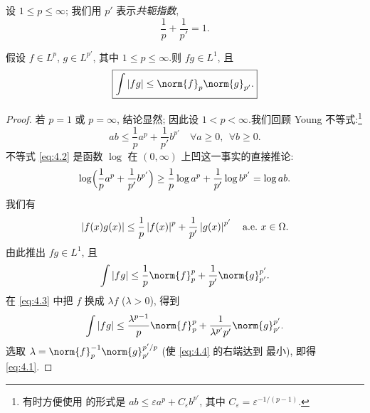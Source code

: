 \begin{notation}
设 $1\le p\le\infty$; 我们用 $p'$ 表示\emph{共轭指数},
\begin{equation*}
\boxed{\frac1p+\frac1{p'}=1.}
\end{equation*}
\end{notation}

\begin{keytheorem}
\label{thm:4.6}
假设 $f\in L^p$, $g\in L^{p'}$, 其中 $1\le p\le\infty$.则 $fg\in L^1$, 且
\begin{equation}
\boxed{\int\abs{fg}\le\norm{f}_p\norm{g}_{p'}.}
\label{eq:4.1}
\end{equation}
\end{keytheorem}

\begin{proof}
若 $p=1$ 或 $p=\infty$, 结论显然; 因此设 $1<p<\infty$.我们回顾 Young 不等式:\footnote{有时方便使用
的形式是 $ab\le\varepsilon a^p+C_\varepsilon b^{p'}$, 其中
$C_\varepsilon=\varepsilon^{-1/(p-1)}$.}
\begin{equation}
\boxed{ab\le\frac1pa^p+\frac1{p'}b^{p'}\quad\forall a\ge0,\ \ \forall b\ge0.}
\label{eq:4.2}
\end{equation}
不等式 \eqref{eq:4.2} 是函数 $\log$ 在 $(0,\infty)$ 上凹这一事实的直接推论:
\begin{equation*}
\log\Bigl(\frac1pa^p+\frac1{p'}b^{p'}\Bigr)\ge\frac1p\log a^p+\frac1{p'}\log b^{p'}
=\log ab.
\end{equation*}
我们有
\begin{equation*}
\left|f(x)g(x)\right|\le\frac1p\left|f(x)\right|^p+\frac1{p'}\left|g(x)\right|^{p'}\quad
\text{a.e.}\ x\in\Omega.
\end{equation*}
由此推出 $fg\in L^1$, 且
\begin{equation}
\int\abs{fg}\le\frac1p\norm{f}_p^p+\frac1{p'}\norm{g}_{p'}^{p'}.
\label{eq:4.3}
\end{equation}
在 \eqref{eq:4.3} 中把 $f$ 换成 $\lambda f$ ($\lambda>0$), 得到
\begin{equation}
\int\abs{fg}\le\frac{\lambda^{p-1}}{p}\norm{f}_p^p
+\frac1{\lambda^{p'}p'}\norm{g}_{p'}^{p'}.
\label{eq:4.4}
\end{equation}
选取 $\lambda=\norm{f}_p^{-1}\norm{g}_{p'}^{p'/p}$ (使 \eqref{eq:4.4} 的右端达到
最小), 即得 \eqref{eq:4.1}.
\end{proof}

